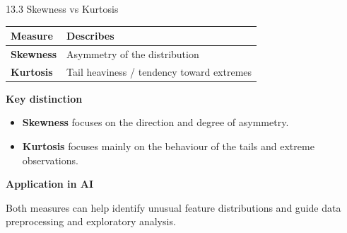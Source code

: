 \begin{frame}{13.3 Skewness vs Kurtosis}

\small

\begin{table}
\centering

\begin{tabular}{>{\bfseries}l l}
\toprule
Measure & Describes \\
\midrule
Skewness & Asymmetry of the distribution \\
Kurtosis & Tail heaviness / tendency toward extremes \\
\bottomrule
\end{tabular}

\end{table}

\vspace{0.5cm}

\textbf{Key distinction}

\begin{itemize}
    \item \textbf{Skewness} focuses on the direction and degree
    of asymmetry.
    
    \item \textbf{Kurtosis} focuses mainly on the behaviour of
    the tails and extreme observations.
\end{itemize}

\vspace{0.3cm}

\textbf{Application in AI}

Both measures can help identify unusual feature distributions
and guide data preprocessing and exploratory analysis.

\end{frame}